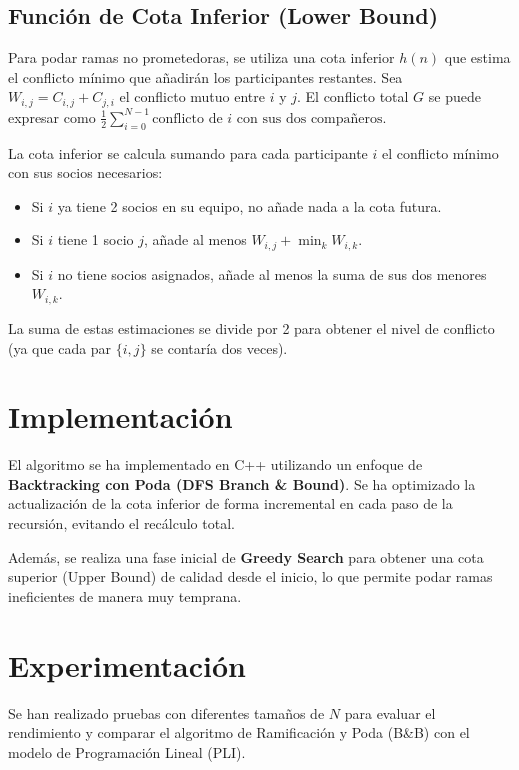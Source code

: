 \documentclass[a4paper,11pt]{article}
\begin{document}
\subsection{Función de Cota Inferior (Lower Bound)}
Para podar ramas no prometedoras, se utiliza una cota inferior $h(n)$ que estima el conflicto mínimo que añadirán los participantes restantes. Sea $W_{i,j} = C_{i,j} + C_{j,i}$ el conflicto mutuo entre $i$ y $j$. El conflicto total $G$ se puede expresar como $\frac{1}{2} \sum_{i=0}^{N-1} \text{conflicto de } i \text{ con sus dos compañeros}$.

La cota inferior se calcula sumando para cada participante $i$ el conflicto mínimo con sus socios necesarios:
\begin{itemize}
    \item Si $i$ ya tiene 2 socios en su equipo, no añade nada a la cota futura.
    \item Si $i$ tiene 1 socio $j$, añade al menos $W_{i,j} + \min_{k} W_{i,k}$.
    \item Si $i$ no tiene socios asignados, añade al menos la suma de sus dos menores $W_{i,k}$.
\end{itemize}
La suma de estas estimaciones se divide por 2 para obtener el nivel de conflicto (ya que cada par $\{i,j\}$ se contaría dos veces).

\section{Implementación}
El algoritmo se ha implementado en C++ utilizando un enfoque de \textbf{Backtracking con Poda (DFS Branch \& Bound)}. Se ha optimizado la actualización de la cota inferior de forma incremental en cada paso de la recursión, evitando el recálculo total.

Además, se realiza una fase inicial de \textbf{Greedy Search} para obtener una cota superior (Upper Bound) de calidad desde el inicio, lo que permite podar ramas ineficientes de manera muy temprana.

\section{Experimentación}
Se han realizado pruebas con diferentes tamaños de $N$ para evaluar el rendimiento y comparar el algoritmo de Ramificación y Poda (B\&B) con el modelo de Programación Lineal (PLI).
\end{document}
